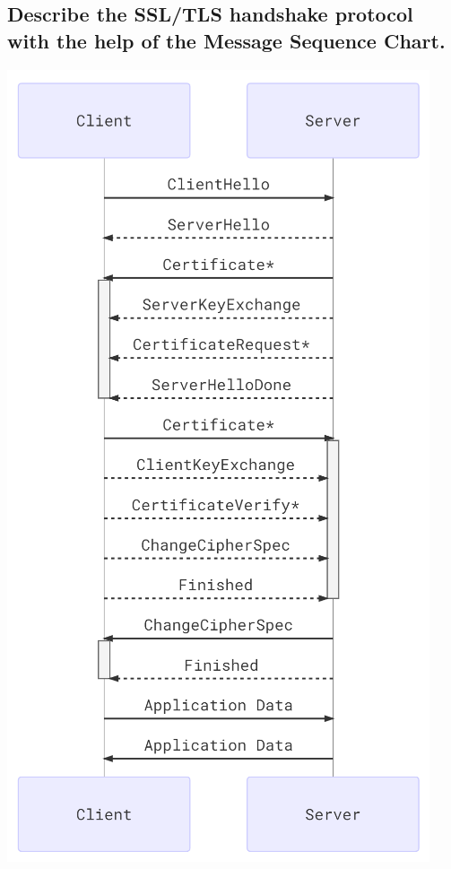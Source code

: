 \documentclass[9pt, letterpaper]{article}
\begin{document}
\subsection{Describe the SSL/TLS handshake protocol with the help of the Message Sequence Chart.}
\begin{center}
	\includegraphics[scale=0.5]{SSLHandshake.png}
\end{center}
\end{document}
